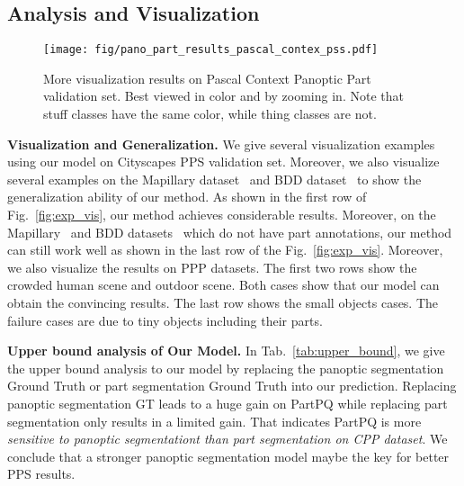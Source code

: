 \subsection{Analysis and Visualization}

\begin{figure*}[!t]
	\centering
	\texttt{[image: fig/pano\_part\_results\_pascal\_contex\_pss.pdf]}
	\caption{\small More visualization results on Pascal Context Panoptic Part validation set. Best viewed in color and by zooming in. Note that stuff classes have the same color, while thing classes are not.}
	\label{fig:vis_results_pascal_pss}
\end{figure*}
\noindent
\textbf{Visualization and Generalization.} We give several visualization examples using our model on Cityscapes PPS validation set. Moreover, we also visualize several examples on the Mapillary dataset~\cite{neuhold2017mapillary} and BDD dataset~\cite{yu2020bdd100k} to show the generalization ability of our method. As shown in the first row of Fig.~\ref{fig:exp_vis}, our method achieves considerable results. Moreover, on the Mapillary~\cite{neuhold2017mapillary} and BDD datasets~\cite{yu2020bdd100k} which do not have part annotations, our method can still work well as shown in the last row of the Fig.~\ref{fig:exp_vis}. Moreover, we also visualize the results on PPP datasets. The first two rows show the crowded human scene and outdoor scene. Both cases show that our model can obtain the convincing results. The last row shows the small objects cases. The failure cases are due to tiny objects including their parts. 

\noindent
\textbf{Upper bound analysis of Our Model.} In Tab.~\ref{tab:upper_bound}, we give the upper bound analysis to our model by replacing the panoptic segmentation Ground Truth or part segmentation Ground Truth into our prediction. Replacing panoptic segmentation GT leads to a huge gain on PartPQ while replacing part segmentation only results in a limited gain. That indicates PartPQ is more \textit{sensitive to panoptic segmentationt than part segmentation on CPP dataset}. We conclude that a stronger panoptic segmentation model maybe the key for better PPS results. 



%

